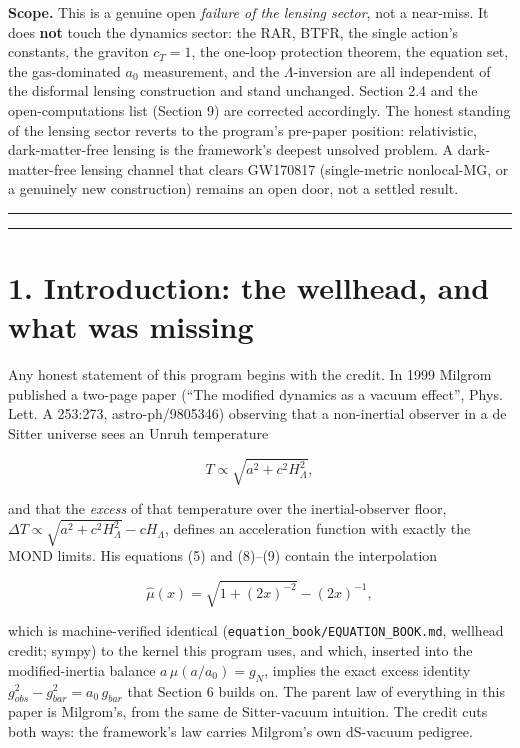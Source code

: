 \documentclass[
]{article}
\begin{document}
\textbf{Scope.} This is a genuine open \emph{failure of the lensing
sector}, not a near-miss. It does \textbf{not} touch the dynamics
sector: the RAR, BTFR, the single action's constants, the graviton
\(c_T=1\), the one-loop protection theorem, the equation set, the
gas-dominated \(a_0\) measurement, and the \(\Lambda\)-inversion are all
independent of the disformal lensing construction and stand unchanged.
Section 2.4 and the open-computations list (Section 9) are corrected
accordingly. The honest standing of the lensing sector reverts to the
program's pre-paper position: relativistic, dark-matter-free lensing is
the framework's deepest unsolved problem. A dark-matter-free lensing
channel that clears GW170817 (single-metric nonlocal-MG, or a genuinely
new construction) remains an open door, not a settled result.

\begin{center}\rule{0.5\linewidth}{0.5pt}\end{center}

\begin{center}\rule{0.5\linewidth}{0.5pt}\end{center}

\section{1. Introduction: the wellhead, and what was
missing}\label{introduction-the-wellhead-and-what-was-missing}

Any honest statement of this program begins with the credit. In 1999
Milgrom published a two-page paper (``The modified dynamics as a vacuum
effect'', Phys. Lett. A 253:273, astro-ph/9805346) observing that a
non-inertial observer in a de Sitter universe sees an Unruh temperature

\[ T \propto \sqrt{a^2 + c^2 H_\Lambda^2}, \]

and that the \emph{excess} of that temperature over the
inertial-observer floor,
\(\Delta T \propto \sqrt{a^2+c^2H_\Lambda^2} - cH_\Lambda\), defines an
acceleration function with exactly the MOND limits. His equations (5)
and (8)--(9) contain the interpolation

\[ \hat\mu(x) = \sqrt{1+(2x)^{-2}} - (2x)^{-1}, \]

which is machine-verified identical
(\texttt{equation\_book/EQUATION\_BOOK.md}, wellhead credit; sympy) to
the kernel this program uses, and which, inserted into the
modified-inertia balance \(a\,\mu(a/a_0)=g_N\), implies the exact excess
identity \(g_{obs}^2 - g_{bar}^2 = a_0\, g_{bar}\) that Section 6 builds
on. The parent law of everything in this paper is Milgrom's, from the
same de Sitter-vacuum intuition. The credit cuts both ways: the
framework's law carries Milgrom's own dS-vacuum pedigree.
\end{document}

